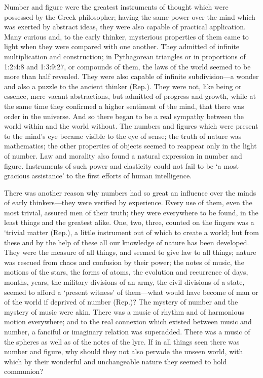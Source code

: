 Number and figure were the greatest instruments of thought which were
possessed by the Greek philosopher; having the same power over the mind
which was exerted by abstract ideas, they were also capable of practical
application. Many curious and, to the early thinker, mysterious properties
of them came to light when they were compared with one another. They
admitted of infinite multiplication and construction; in Pythagorean
triangles or in proportions of 1:2:4:8 and 1:3:9:27, or compounds of them,
the laws of the world seemed to be more than half revealed. They were also
capable of infinite subdivision—a wonder and also a puzzle to the
ancient thinker (Rep.). They were not, like being or essence, mere vacant
abstractions, but admitted of progress and growth, while at the same time
they confirmed a higher sentiment of the mind, that there was order in the
universe. And so there began to be a real sympathy between the world
within and the world without. The numbers and figures which were present
to the mind’s eye became visible to the eye of sense; the truth of nature
was mathematics; the other properties of objects seemed to reappear only
in the light of number. Law and morality also found a natural expression
in number and figure. Instruments of such power and elasticity could not
fail to be ‘a most gracious assistance’ to the first efforts of human
intelligence.

There was another reason why numbers had so great an influence over the
minds of early thinkers—they were verified by experience. Every use
of them, even the most trivial, assured men of their truth; they were
everywhere to be found, in the least things and the greatest alike. One,
two, three, counted on the fingers was a ‘trivial matter (Rep.), a little
instrument out of which to create a world; but from these and by the help
of these all our knowledge of nature has been developed. They were the
measure of all things, and seemed to give law to all things; nature was
rescued from chaos and confusion by their power; the notes of music, the
motions of the stars, the forms of atoms, the evolution and recurrence of
days, months, years, the military divisions of an army, the civil
divisions of a state, seemed to afford a ‘present witness’ of them—what
would have become of man or of the world if deprived of number (Rep.)? The
mystery of number and the mystery of music were akin. There was a music of
rhythm and of harmonious motion everywhere; and to the real connexion
which existed between music and number, a fanciful or imaginary relation
was superadded. There was a music of the spheres as well as of the notes
of the lyre. If in all things seen there was number and figure, why should
they not also pervade the unseen world, with which by their wonderful and
unchangeable nature they seemed to hold communion?

